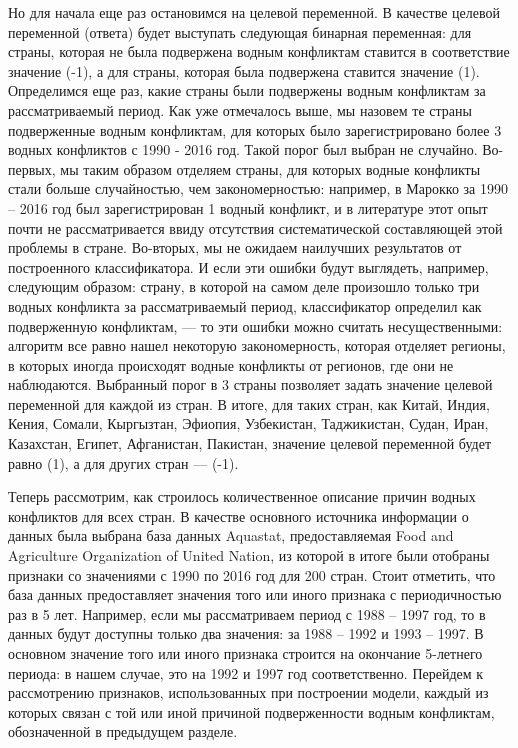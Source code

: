 \documentclass[a4paper, 12pt]{article}
\theoremstyle{plain} %
\theoremstyle{definition} %
\theoremstyle{remark} %
\begin{document}
Но для начала еще раз остановимся на целевой переменной. В качестве целевой переменной (ответа) будет выступать следующая бинарная переменная: для страны, которая не была подвержена водным конфликтам ставится в соответствие значение (-1), а для страны, которая была подвержена ставится значение (1). Определимся еще раз, какие страны были подвержены водным конфликтам за рассматриваемый период. Как уже отмечалось выше, мы назовем те страны подверженные водным конфликтам, для которых было зарегистрировано более 3 водных конфликтов с 1990 - 2016 год. Такой порог был выбран не случайно. Во-первых, мы таким образом отделяем страны, для которых водные конфликты стали больше случайностью, чем закономерностью: например, в Марокко за 1990 – 2016 год был зарегистрирован 1 водный конфликт, и в литературе этот опыт почти не рассматривается ввиду отсутствия систематической составляющей этой проблемы в стране. Во-вторых, мы не ожидаем наилучших результатов от построенного классификатора. И если эти ошибки будут выглядеть, например, следующим образом: страну, в которой на самом деле произошло только три водных конфликта за рассматриваемый период, классификатор определил как подверженную конфликтам, --- то эти ошибки можно считать несущественными: алгоритм все равно нашел некоторую закономерность, которая отделяет регионы, в которых иногда происходят водные конфликты от регионов, где они не наблюдаются. Выбранный порог в 3 страны позволяет задать значение целевой переменной для каждой из стран. В итоге, для таких стран, как Китай, Индия, Кения, Сомали, Кыргызтан, Эфиопия, Узбекистан, Таджикистан, Судан, Иран, Казахстан, Египет, Афганистан, Пакистан, значение целевой переменной будет равно (1), а для других стран --- (-1). 

Теперь рассмотрим, как строилось количественное описание причин водных конфликтов для всех стран. В качестве основного источника информации о данных была выбрана база данных Aquastat, предоставляемая Food and Agriculture Organization of United Nation, из которой в итоге были отобраны признаки со значениями с 1990 по 2016 год для 200 стран. Стоит отметить, что база данных предоставляет значения того или иного признака с периодичностью раз в 5 лет. Например, если мы рассматриваем период с 1988 – 1997 год, то в данных будут доступны только два значения: за 1988 – 1992 и 1993 – 1997. В основном значение того или иного признака строится на окончание 5-летнего периода: в нашем случае, это на 1992 и 1997 год соответственно. Перейдем к рассмотрению признаков, использованных при построении модели, каждый из которых связан с той или иной причиной подверженности водным конфликтам, обозначенной в предыдущем разделе.
\end{document}
